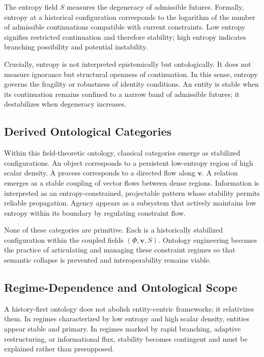 \documentclass[12pt]{article}
\begin{document}
The entropy field $S$ measures the degeneracy of admissible futures. Formally, entropy at a historical configuration corresponds to the logarithm of the number of admissible continuations compatible with current constraints. Low entropy signifies restricted continuation and therefore stability; high entropy indicates branching possibility and potential instability.

Crucially, entropy is not interpreted epistemically but ontologically. It does not measure ignorance but structural openness of continuation. In this sense, entropy governs the fragility or robustness of identity conditions. An entity is stable when its continuation remains confined to a narrow band of admissible futures; it destabilizes when degeneracy increases.

\subsection{Derived Ontological Categories}

Within this field-theoretic ontology, classical categories emerge as stabilized configurations. An object corresponds to a persistent low-entropy region of high scalar density. A process corresponds to a directed flow along $\mathbf{v}$. A relation emerges as a stable coupling of vector flows between dense regions. Information is interpreted as an entropy-constrained, projectable pattern whose stability permits reliable propagation. Agency appears as a subsystem that actively maintains low entropy within its boundary by regulating constraint flow.

None of these categories are primitive. Each is a historically stabilized configuration within the coupled fields $(\Phi, \mathbf{v}, S)$. Ontology engineering becomes the practice of articulating and managing these constraint regimes so that semantic collapse is prevented and interoperability remains viable.

\subsection{Regime-Dependence and Ontological Scope}

A history-first ontology does not abolish entity-centric frameworks; it relativizes them. In regimes characterized by low entropy and high scalar density, entities appear stable and primary. In regimes marked by rapid branching, adaptive restructuring, or informational flux, stability becomes contingent and must be explained rather than presupposed.
\end{document}
